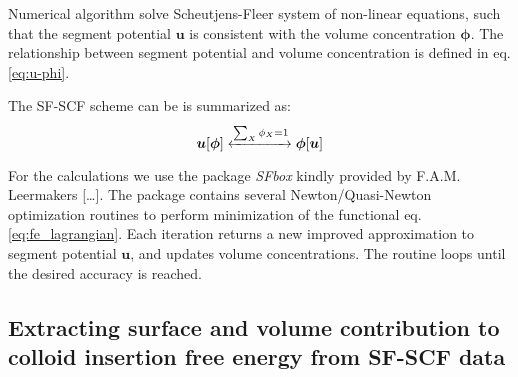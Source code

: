 \documentclass[10pt, a4paper]{article}
\begin{document}
\begin{multicols}{2}
Numerical algorithm solve Scheutjens-Fleer system of non-linear equations, such that the segment potential $\mathbf{u}$ is consistent with the volume concentration $\mathbf{\phi}$.
The relationship between segment potential and volume concentration is defined in eq. \ref{eq:u-phi}.

The SF-SCF scheme can be is summarized as:
\begin{equation}
    \bm{u}[\bm{\phi}] \xleftrightarrow[]{\sum_{X} \phi_X = 1} \bm{\phi}[\bm{u}]
\end{equation}

For the calculations we use the package \emph{SFbox} kindly provided by F.A.M. Leermakers [\dots].
The package contains several Newton/Quasi-Newton optimization routines to perform minimization of the functional eq.\ref{eq:fe_lagrangian}.
Each iteration returns a new improved approximation to segment potential $\mathbf{u}$, and updates volume concentrations.
The routine loops until the desired accuracy is reached.


\end{multicols}
\subsection*{Extracting surface and volume contribution to colloid insertion free energy from SF-SCF data}
\end{document}
